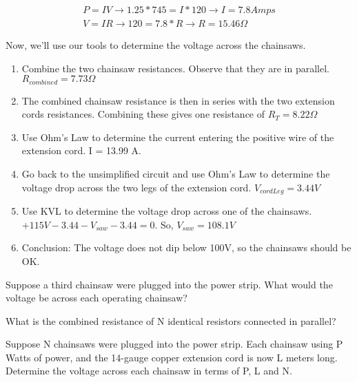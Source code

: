 \begin{align}
P=IV \rightarrow 1.25*745 = I*120 \rightarrow I=7.8 Amps\\
V = IR \rightarrow 120 = 7.8*R \rightarrow R = 15.46 \Omega
\end{align}

Now, we'll use our tools to determine the voltage across the chainsaws.

\begin{enumerate}
\item Combine the two chainsaw resistances. Observe that they are in parallel. $R_{combined} = 7.73 \Omega$
\item The combined chainsaw resistance is then in series with the two extension cords resistances. Combining these gives one resistance of $R_T=8.22 \Omega$
\item Use Ohm's Law to determine the current entering the positive wire of the extension cord. I = 13.99 A.
\item Go back to the unsimplified circuit and use Ohm's Law to determine the voltage drop across the two legs of the extension cord. $V_{cordLeg} =3.44 V$
\item Use KVL to determine the voltage drop across one of the chainsaws. $+115V - 3.44 - V_{saw} - 3.44 = 0$. So, $V_{saw}=108.1 V$ 
\item Conclusion: The voltage does not dip below 100V, so the chainsaws should be OK.
\end{enumerate}

\begin{blevel}
Suppose a third chainsaw were plugged into the power strip. What would the voltage be across each operating chainsaw?
\end{blevel}

\begin{clevel}
What is the combined resistance of N identical resistors connected in parallel?
\end{clevel}

\begin{clevel}
Suppose N chainsaws were plugged into the power strip. Each chainsaw using P Watts of power, and the 14-gauge copper extension cord is now L meters long. Determine the voltage across each chainsaw in terms of P, L and N.
\end{clevel}

